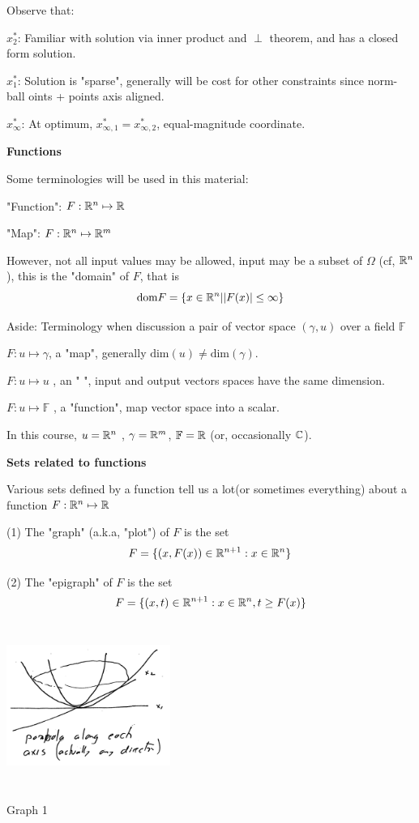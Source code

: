 Observe that:

$x_{2}^{*}$: Familiar with solution via inner product and $\perp$ theorem, and has a closed form solution.

$x_{1}^{*}$: Solution is "sparse", generally will be cost for other constraints since norm-ball oints + points axis aligned.

$x_{\infty}^{*}$: At optimum, $x_{\infty, 1}^{*}=x_{\infty, 2}^{*}$, equal-magnitude coordinate.


\vspace{0.5cm}
\noindent\textbf{Functions}

Some terminologies will be used in this material:

"Function":  $F:\mathbb{R}^{n}\mapsto \mathbb{R}$

"Map":  $F:\mathbb{R}^{n}\mapsto \mathbb{R}^{m}$


However, not all input values may be allowed, input may be a subset of $\Omega$ (cf, $\mathbb{R}^{n}$), this is the "domain" of $F$, that is
$$\text{dom} F= \{x\in\mathbb{R}^{n}|\vert F(x)\vert\leq\infty\}$$


Aside: Terminology when discussion a pair of vector space $(\gamma,u)$ over a field $\mathbb{F}$

$F:u\mapsto \gamma$, a "map", generally $\text{dim}(u)\neq \text{dim}(\gamma)$.

$F:u\mapsto u$ , an "   ", input and output vectors spaces have the same dimension.

$F:u\mapsto \mathbb{F}$ , a "function", map vector space into a scalar.

In this course, $u=\mathbb{R}^{n}$ , $\gamma=\mathbb{R}^{m}$, $\mathbb{F}=\mathbb{R}$ (or, occasionally $\mathbb{C}$).


\vspace{0.3cm}
\textbf{Sets related to functions}

Various sets defined by a function tell us a lot(or sometimes everything) about a function $F:\mathbb{R}^{n}\mapsto\mathbb{R}$

(1) The "graph" (a.k.a, "plot") of $F$ is the set
$$F=\{(x,F(x))\in\mathbb{R}^{n+1}:x\in\mathbb{R}^{n}\}$$

(2) The "epigraph" of $F$ is the set 
$$F=\{(x,t)\in\mathbb{R}^{n+1}:x\in\mathbb{R}^{n}, t\geq F(x) \}$$

\begin{marginfigure}
	\centering
	\includegraphics[width=2.1in,height=2.1in]{figures/ch02/p48-1.jpg}
	\caption{Graph 1} 
\end{marginfigure}

